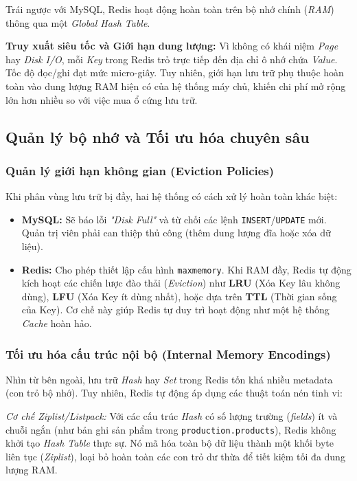 Trái ngược với MySQL, Redis hoạt động hoàn toàn trên bộ nhớ chính (\textit{RAM}) thông qua một \textit{Global Hash Table}.

\vspace{1em}

\noindent\textbf{Truy xuất siêu tốc và Giới hạn dung lượng:} 
Vì không có khái niệm \textit{Page} hay \textit{Disk I/O}, mỗi \textit{Key} trong Redis trỏ trực tiếp đến địa chỉ ô nhớ chứa \textit{Value}. Tốc độ đọc/ghi đạt mức micro-giây. Tuy nhiên, giới hạn lưu trữ phụ thuộc hoàn toàn vào dung lượng RAM hiện có của hệ thống máy chủ, khiến chi phí mở rộng lớn hơn nhiều so với việc mua ổ cứng lưu trữ.


\subsection{Quản lý bộ nhớ và Tối ưu hóa chuyên sâu}

\subsubsection{Quản lý giới hạn không gian (Eviction Policies)}
Khi phân vùng lưu trữ bị đầy, hai hệ thống có cách xử lý hoàn toàn khác biệt:

\begin{itemize}
    \item \textbf{MySQL:} Sẽ báo lỗi \textit{"Disk Full"} và từ chối các lệnh \texttt{INSERT}/\texttt{UPDATE} mới. Quản trị viên phải can thiệp thủ công (thêm dung lượng đĩa hoặc xóa dữ liệu).
    \item \textbf{Redis:} Cho phép thiết lập cấu hình \texttt{maxmemory}. Khi RAM đầy, Redis tự động kích hoạt các chiến lược đào thải (\textit{Eviction}) như \textbf{LRU} (Xóa Key lâu không dùng), \textbf{LFU} (Xóa Key ít dùng nhất), hoặc dựa trên \textbf{TTL} (Thời gian sống của Key). Cơ chế này giúp Redis tự duy trì hoạt động như một hệ thống \textit{Cache} hoàn hảo.
\end{itemize}

\subsubsection{Tối ưu hóa cấu trúc nội bộ (Internal Memory Encodings)}
Nhìn từ bên ngoài, lưu trữ \textit{Hash} hay \textit{Set} trong Redis tốn khá nhiều metadata (con trỏ bộ nhớ). Tuy nhiên, Redis tự động áp dụng các thuật toán nén tinh vi:

\textit{Cơ chế Ziplist/Listpack:} Với các cấu trúc \textit{Hash} có số lượng trường (\textit{fields}) ít và chuỗi ngắn (như bản ghi sản phẩm trong \texttt{production.products}), Redis không khởi tạo \textit{Hash Table} thực sự. Nó mã hóa toàn bộ dữ liệu thành một khối byte liên tục (\textit{Ziplist}), loại bỏ hoàn toàn các con trỏ dư thừa để tiết kiệm tối đa dung lượng RAM.


